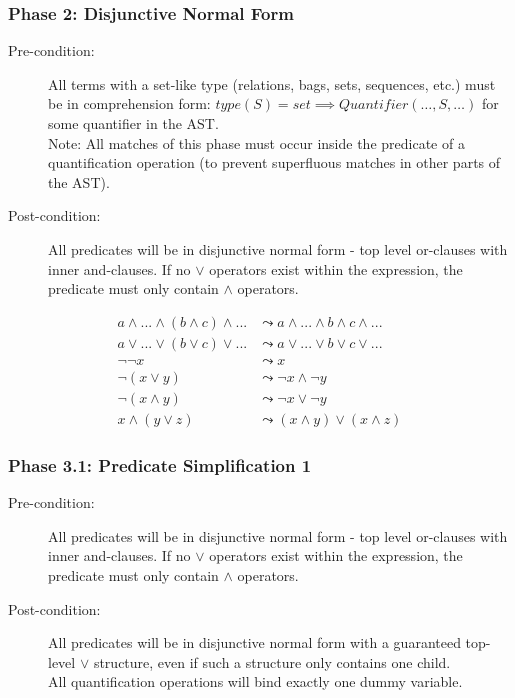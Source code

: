 \documentclass{article}
\begin{document}
\subsubsection{Phase 2: Disjunctive Normal Form}

\begin{description}
  \item[Pre-condition:] All terms with a set-like type (relations, bags, sets, sequences, etc.) must be in comprehension form: $type(S) = set \implies Quantifier(\dots,S,\dots)$ for some quantifier in the AST.
  \\Note: All matches of this phase must occur inside the predicate of a quantification operation (to prevent superfluous matches in other parts of the AST).
  \item[Post-condition:] All predicates will be in disjunctive normal form - top level or-clauses with inner and-clauses. If no $\lor$ operators exist within the expression, the predicate must only contain $\land$ operators.
\end{description}

\noindent\begin{minipage}{\linewidth} %
\begin{align}
  \tag{Flatten Nested Ands}
  a \land ... \land (b \land c) \land ...
  &\leadsto
  a \land ... \land b \land c \land ...
  \\
  \tag{Flatten Nested Ors}
  a \lor ... \lor (b \lor c) \lor ...
  &\leadsto
  a \lor ... \lor b \lor c \lor ...
  \\
  \tag{Double Negation}
  \lnot \lnot x
  &\leadsto
  x
  \\
  \tag{Distribute De Morgan - Or}
  \lnot (x \lor y)
  &\leadsto
  \lnot x \land \lnot y
  \\
  \tag{Distribute De Morgan - And}
  \lnot (x \land y)
  &\leadsto
  \lnot x \lor \lnot y
  \\
  \tag{Distribute Ands}
  x \land (y \lor z)
  &\leadsto
  (x \land y) \lor (x \land z)
\end{align}
\end{minipage}

\subsubsection{Phase 3.1: Predicate Simplification 1}

\begin{description}
  \item[Pre-condition:] All predicates will be in disjunctive normal form - top level or-clauses with inner and-clauses. If no $\lor$ operators exist within the expression, the predicate must only contain $\land$ operators.
  \item[Post-condition:] All predicates will be in disjunctive normal form with a guaranteed top-level $\lor$ structure, even if such a structure only contains one child.
  \\
  All quantification operations will bind exactly one dummy variable.
\end{description}
\end{document}
